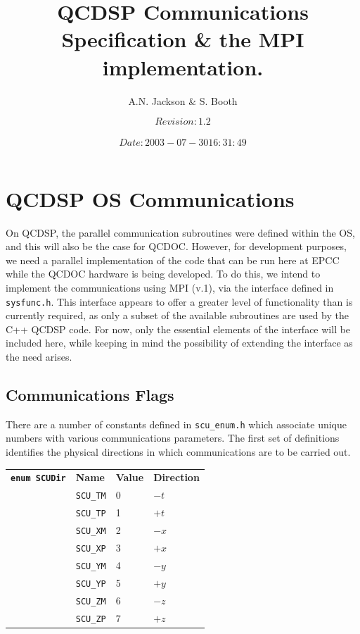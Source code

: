 \documentclass[12pt]{article}
\title{QCDSP Communications Specification \& the MPI implementation.}
\author{A.N. Jackson \& S. Booth}
\date{\mbox{\small $$Revision: 1.2 $$  $$Date: 2003-07-30 16:31:49 $$}}
\newcommand{\cde}[1]{{\tt #1}}            %
\begin{document}
\maketitle

\tableofcontents
\newpage

\section{QCDSP OS Communications}
On QCDSP, the parallel communication subroutines were defined within
the OS, and this will also be the case for QCDOC.  However, for
development purposes, we need a parallel implementation of the code
that can be run here at EPCC while the QCDOC hardware is being
developed.  To do this, we intend to implement the communications
using MPI (v.1), via the interface defined in \cde{sysfunc.h}.  This
interface appears to offer a greater level of functionality than is
currently required, as only a subset of the available subroutines are
used by the C++ QCDSP code.  For now, only the essential elements of
the interface will be included here, while keeping in mind the
possibility of extending the interface as the need arises.

\subsection{Communications Flags}
\label{col:comm:flags}
There are a number of constants defined in \cde{scu\_enum.h} which
associate unique numbers with various communications parameters.  The
first set of definitions identifies the physical directions in which
communications are to be carried out.

\begin{tabular}{llll}
\cde{{\bf enum SCUDir}} & {\bf Name} & {\bf Value} & {\bf Direction} \\
			&\cde{SCU\_\-TM} & 0 & $-t$\\
			&\cde{SCU\_\-TP} & 1 & $+t$\\
			&\cde{SCU\_\-XM} & 2 & $-x$\\
			&\cde{SCU\_\-XP} & 3 & $+x$\\
			&\cde{SCU\_\-YM} & 4 & $-y$\\
			&\cde{SCU\_\-YP} & 5 & $+y$\\
			&\cde{SCU\_\-ZM} & 6 & $-z$\\
			&\cde{SCU\_\-ZP} & 7 & $+z$
\end{tabular}
\end{document}

